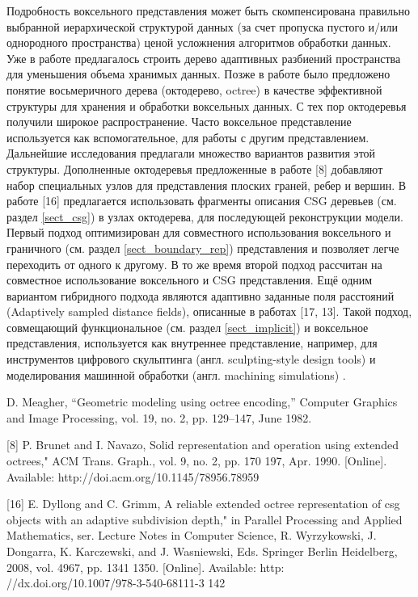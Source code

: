 Подробность воксельного представления может быть скомпенсирована правильно выбранной иерархической структурой данных (за счет пропуска пустого и/или однородного пространства) ценой усложнения алгоритмов обработки данных. Уже в работе \cite{REDD78} предлагалось строить дерево адаптивных разбиений пространства для уменьшения объема хранимых данных. Позже в работе \cite{Meagher82} было предложено понятие восьмеричного дерева (октодерево, octree) в качестве эффективной структуры для хранения и обработки воксельных данных. С тех пор октодеревья получили широкое распространение. Часто воксельное представление используется как вспомогательное, для работы с другим представлением. Дальнейшие исследования предлагали множество вариантов развития этой структуры. Дополненные октодеревья предложенные в работе [8] добавляют набор специальных узлов для представления плоских граней, ребер и вершин. В работе [16] предлагается использовать фрагменты описания CSG деревьев (см. раздел \ref{sect_csg}) в узлах октодерева, для последующей реконструкции модели. Первый подход оптимизирован для совместного использования воксельного и граничного (см. раздел \ref{sect_boundary_rep}) представления и позволяет легче переходить от одного к другому. В то же время второй подход рассчитан на совместное использование воксельного и CSG представления. Ещё одним вариантом гибридного подхода являются адаптивно заданные поля расстояний (Adaptively sampled distance fields), описанные в работах [17, 13]. Такой подход, совмещающий функциональное (см. раздел \ref{sect_implicit}) и воксельное представления, используется как внутреннее представление, например, для инструментов цифрового скульптинга (англ. sculpting-style design tools) \todo{[43]} и моделирования машинной обработки (англ. machining simulations) \todo{[46]}.

D. Meagher, “Geometric modeling using octree encoding,” Computer Graphics
and Image Processing, vol. 19, no. 2, pp. 129–147, June 1982.

[8] P. Brunet and I. Navazo, Solid representation and operation using extended
octrees," ACM Trans. Graph., vol. 9, no. 2, pp. 170 197, Apr. 1990. [Online].
Available: http://doi.acm.org/10.1145/78956.78959

[16] E. Dyllong and C. Grimm, A reliable extended octree representation of
csg objects with an adaptive subdivision depth," in Parallel Processing and
Applied Mathematics, ser. Lecture Notes in Computer Science, R. Wyrzykowski,
J. Dongarra, K. Karczewski, and J. Wasniewski, Eds. Springer Berlin
Heidelberg, 2008, vol. 4967, pp. 1341 1350. [Online]. Available: http:
//dx.doi.org/10.1007/978-3-540-68111-3 142

